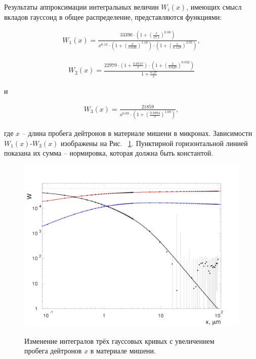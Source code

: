 \documentclass[a4paper,12pt]{article}
\begin{document}
\begin{large}
  	Результаты аппроксимации интегральных величин $W_i(x)$, имеющих смысл вкладов гауссоид в общее распределение, представляются функциями:
  
\begin{equation}
\label{MSApproximationW1}
\begin{aligned} 
  W_1(x)= \frac{33390\cdot (1+\left(\frac{x}{17.1}\right)^{0.88})}{x^{0.12} \cdot \left(1+\left(\frac{x}{0.636}\right)^{1.16}\right) \cdot \left(1+\left(\frac{x}{6.128}\right)^{2.05}\right)},
\end{aligned}
\end{equation}

\begin{equation}
\label{MSApproximationW2}
\begin{aligned} 
  W_2(x)= \frac{22979\cdot \left(1+\frac{0.0717}{x}\right)\cdot \left(1+\left(\frac{x}{9.628}\right)^{0.032}\right)}{1+\frac{0.27}{x}}
\end{aligned}
\end{equation}

и

\begin{equation}
\label{MSApproximationW3}
\begin{aligned} 
  W_3(x)= \frac{21859}{x^{0.09}\cdot\left(1+\left(\frac{0.8884}{x}\right)^{1.08}\right)},
\end{aligned}
\end{equation}

	где $x$ -- длина пробега дейтронов в материале мишени в микронах.
	Зависимости $W_1(x)$-$W_3(x)$ изображены на Рис. ~\ref{fig:Par1theta}. Пунктирной горизонтальной линией показана их сумма -- нормировка, которая должна быть константой.

\begin{figure}[ht]
  {
     \includegraphics[width=0.99\linewidth]{images/pars135}
  }
  \caption{Изменение интегралов трёх гауссовых кривых с увеличением пробега дейтронов $x$ в материале мишени.}
  \label{fig:Par1theta}
\end{figure}


\end{large}
\end{document}
